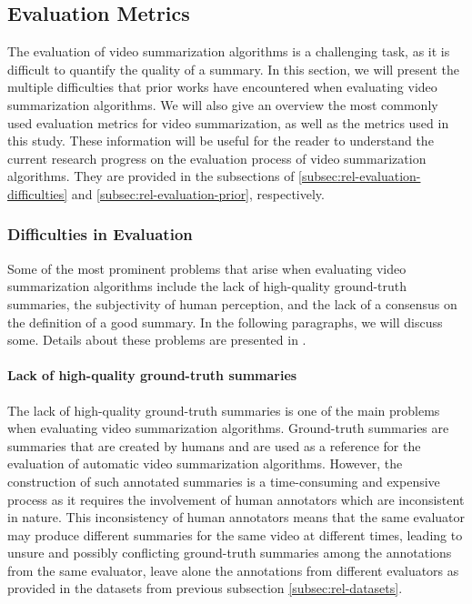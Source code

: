 
\subsection{Evaluation Metrics}
\label{subsec:rel-evaluation}

	The evaluation of video summarization algorithms is a challenging task, as it is difficult to quantify the quality of a summary. In this section, we will present the multiple difficulties that prior works have encountered when evaluating video summarization algorithms. We will also give an overview the most commonly used evaluation metrics for video summarization, as well as the metrics used in this study. These information will be useful for the reader to understand the current research progress on the evaluation process of video summarization algorithms. They are provided in the subsections of \ref{subsec:rel-evaluation-difficulties} and \ref{subsec:rel-evaluation-prior}, respectively.
	
	\subsubsection{Difficulties in Evaluation}
	\label{subsubsec:rel-evaluation-difficulties}
		Some of the most prominent problems that arise when evaluating video summarization algorithms include the lack of high-quality ground-truth summaries, the subjectivity of human perception, and the lack of a consensus on the definition of a good summary. In the following paragraphs, we will discuss some. Details about these problems are presented in \cite{Apostolidis2021Video}.

			\paragraph[short]{Lack of high-quality ground-truth summaries}
				The lack of high-quality ground-truth summaries is one of the main problems when evaluating video summarization algorithms. Ground-truth summaries are summaries that are created by humans and are used as a reference for the evaluation of automatic video summarization algorithms. However, the construction of such annotated summaries is a time-consuming and expensive process as it requires the involvement of human annotators which are inconsistent in nature. This inconsistency of human annotators means that the same evaluator may produce different summaries for the same video at different times, leading to unsure and possibly conflicting ground-truth summaries among the annotations from the same evaluator, leave alone the annotations from different evaluators as provided in the datasets from previous subsection \ref{subsec:rel-datasets}.

